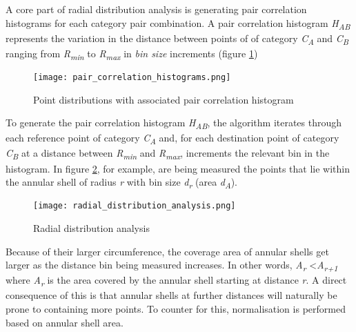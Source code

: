 A core part of radial distribution analysis is generating pair correlation histograms for each category pair combination. A pair correlation histogram \textit{H\textsubscript{AB}} represents the variation in the distance between points of of category \textit{C\textsubscript{A}} and \textit{C\textsubscript{B}} ranging from \textit{R\textsubscript{min}} to \textit{R\textsubscript{max}} in \textit{bin size} increments (figure \ref{Pair Correlation Histograms}) \\

\begin{figure}[h]
  \centering
	\texttt{[image: pair\_correlation\_histograms.png]}
	\caption{Point distributions with associated pair correlation histogram \cite{Emilien2014}}
	\label{Pair Correlation Histograms}
\end{figure}

To generate the pair correlation histogram \textit{H\textsubscript{AB}}, the algorithm iterates through each reference point of category \textit{C\textsubscript{A}} and, for each destination point of category \textit{C\textsubscript{B}} at a distance between \textit{R\textsubscript{min}} and \textit{R\textsubscript{max}}, increments the relevant bin in the histogram. In figure \ref{Radial distribution analysis}, for example, are being measured the points that lie within the annular shell of radius \textit{r} with bin size \textit{d\textsubscript{r}} (area \textit{d\textsubscript{A}}). 

\begin{figure}[h]
  \centering
	\texttt{[image: radial\_distribution\_analysis.png]}
	\caption{Radial distribution analysis}
	\label{Radial distribution analysis}
\end{figure}

Because of their larger circumference, the coverage area of annular shells get larger as the distance bin being measured increases. In other words, \textit{A\textsubscript{r}} \textless \textit{A\textsubscript{r+1}} where \textit{A\textsubscript{r}} is the area covered by the annular shell starting at distance \textit{r}. A direct consequence of this is that annular shells at further distances will naturally be prone to containing more points. To counter for this, normalisation is performed based on annular shell area. \\

